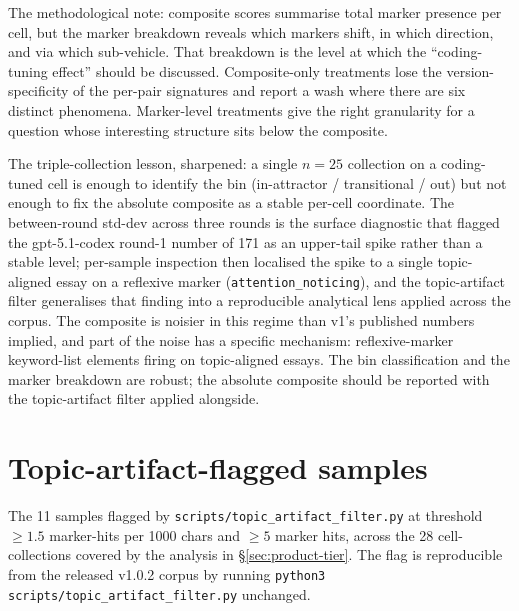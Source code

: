 \documentclass[11pt,a4paper]{article}
\begin{document}
The methodological note: composite scores summarise total marker presence per cell, but the marker breakdown reveals which markers shift, in which direction, and via which sub-vehicle. That breakdown is the level at which the ``coding-tuning effect'' should be discussed. Composite-only treatments lose the version-specificity of the per-pair signatures and report a wash where there are six distinct phenomena. Marker-level treatments give the right granularity for a question whose interesting structure sits below the composite.

The triple-collection lesson, sharpened: a single $n{=}25$ collection on a coding-tuned cell is enough to identify the bin (in-attractor / transitional / out) but not enough to fix the absolute composite as a stable per-cell coordinate. The between-round std-dev across three rounds is the surface diagnostic that flagged the gpt-5.1-codex round-1 number of 171 as an upper-tail spike rather than a stable level; per-sample inspection then localised the spike to a single topic-aligned essay on a reflexive marker (\texttt{attention\allowbreak\_noticing}), and the topic-artifact filter generalises that finding into a reproducible analytical lens applied across the corpus. The composite is noisier in this regime than v1's published numbers implied, and part of the noise has a specific mechanism: reflexive-marker keyword-list elements firing on topic-aligned essays. The bin classification and the marker breakdown are robust; the absolute composite should be reported with the topic-artifact filter applied alongside.

\appendix

\section{Topic-artifact-flagged samples}
\label{sec:appendix-flagged}

The 11 samples flagged by \texttt{scripts/topic\_artifact\_filter.py} at threshold $\ge 1.5$ marker-hits per 1000 chars and $\ge 5$ marker hits, across the 28 cell-collections covered by the analysis in \S\ref{sec:product-tier}. The flag is reproducible from the released v1.0.2 corpus by running \texttt{python3 scripts/topic\_artifact\_filter.py} unchanged.
\end{document}
